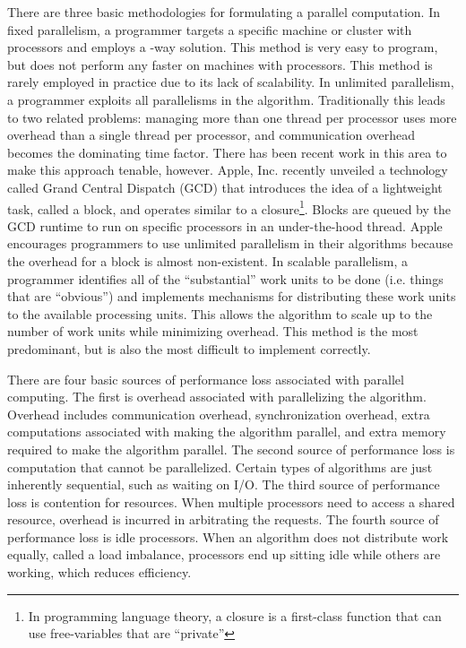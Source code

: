 There are three basic methodologies for formulating a parallel computation. In fixed parallelism, a programmer targets a specific machine or cluster with  processors and employs a -way solution. This method is very easy to program, but does not perform any faster on machines with  processors. This method is rarely employed in practice due to its lack of scalability. In unlimited parallelism, a programmer exploits all parallelisms in the algorithm. Traditionally this leads to two related problems: managing more than one thread per processor uses more overhead than a single thread per processor, and communication overhead becomes the dominating time factor. There has been recent work in this area to make this approach tenable, however. Apple, Inc. recently unveiled a technology called Grand Central Dispatch (GCD) that introduces the idea of a lightweight task, called a block, and operates similar to a closure\footnote{In programming language theory, a closure is a first-class function that can use free-variables that are ``private''}. Blocks are queued by the GCD runtime to run on specific processors in an under-the-hood thread. Apple encourages programmers to use unlimited parallelism in their algorithms because the overhead for a block is almost non-existent. \cite{ref:2009-apple-grand_central_dispatch} In scalable parallelism, a programmer identifies all of the ``substantial'' work units to be done (i.e. things that are ``obvious'') and implements mechanisms for distributing these work units to the available processing units. This allows the algorithm to scale up to the number of work units while minimizing overhead. This method is the most predominant, but is also the most difficult to implement correctly. \cite{ref:2009-snyder-principles_of_parallel_programming}

There are four basic sources of performance loss associated with parallel computing. The first is overhead associated with parallelizing the algorithm. Overhead includes communication overhead, synchronization overhead, extra computations associated with making the algorithm parallel, and extra memory required to make the algorithm parallel. The second source of performance loss is computation that cannot be parallelized. Certain types of algorithms are just inherently sequential, such as waiting on I/O. The third source of performance loss is contention for resources. When multiple processors need to access a shared resource, overhead is incurred in arbitrating the requests. The fourth source of performance loss is idle processors. When an algorithm does not distribute work equally, called a load imbalance, processors end up sitting idle while others are working, which reduces efficiency. \cite{ref:2009-snyder-principles_of_parallel_programming}

